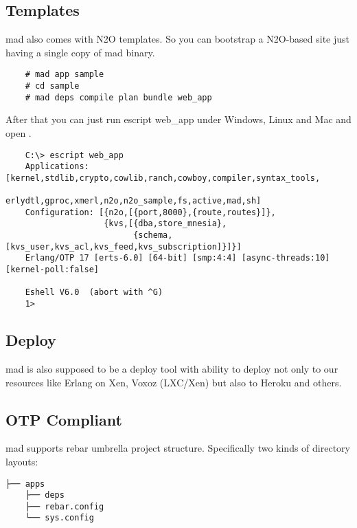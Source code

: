 \subsection{Templates}

mad also comes with N2O templates. So you can bootstrap a N2O-based site
just having a single copy of mad binary.

\vspace{1\baselineskip}
\begin{lstlisting}
    # mad app sample
    # cd sample
    # mad deps compile plan bundle web_app
\end{lstlisting}
\vspace{1\baselineskip}

After that you can just run escript web_app under Windows, Linux and
Mac and open .

\vspace{1\baselineskip}
\begin{lstlisting}
    C:\> escript web_app
    Applications: [kernel,stdlib,crypto,cowlib,ranch,cowboy,compiler,syntax_tools,
                   erlydtl,gproc,xmerl,n2o,n2o_sample,fs,active,mad,sh]
    Configuration: [{n2o,[{port,8000},{route,routes}]},
                    {kvs,[{dba,store_mnesia},
                          {schema,[kvs_user,kvs_acl,kvs_feed,kvs_subscription]}]}]
    Erlang/OTP 17 [erts-6.0] [64-bit] [smp:4:4] [async-threads:10] [kernel-poll:false]

    Eshell V6.0  (abort with ^G)
    1>
\end{lstlisting}
\vspace{1\baselineskip}

\subsection{Deploy}

mad is also supposed to be a deploy tool with ability to
deploy not only to our resources like Erlang on Xen, Voxoz (LXC/Xen) but
also to Heroku and others.

\subsection{OTP Compliant}

mad supports rebar umbrella project structure.
Specifically two kinds of directory layouts:

\vspace{1\baselineskip}
\begin{lstlisting}[caption=Solution]
    ├── apps
    ├── deps
    ├── rebar.config
    └── sys.config
\end{lstlisting}
\vspace{1\baselineskip}

